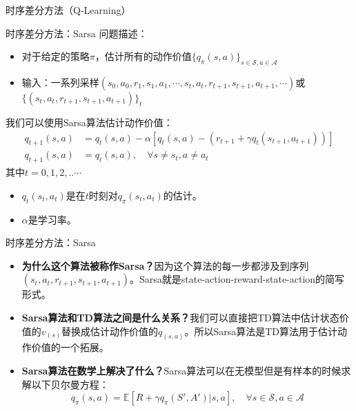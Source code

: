 \begin{section}{时序差分方法\alert{（Q-Learning）}}
\begin{frame}{时序差分方法：Sarsa}
    问题描述：
    \begin{itemize}
        \item 对于给定的策略$\pi$，估计所有的动作价值$\{q_\pi(s, a)\}_{s\in \mathcal{S}, a\in\mathcal{A}}$
        \item 输入：一系列采样\alert{$(s_0, a_0, r_1, s_1, a_1,\cdots,s_t, a_t, r_{t+1}, s_{t+1}, a_{t+1},\cdots)$}或$\{(s_t, a_t, r_{t+1}, s_{t+1}, a_{t+1})\}_t$
    \end{itemize}
    我们可以使用Sarsa算法估计动作价值：
    \[
        \begin{aligned}
            q_{t+1}(s,a)&=q_t(s,a)-\alpha[q_t(s,a)-(r_{t+1}+\gamma q_t(s_{t+1},a_{t+1}))] \\
            q_{t+1}(s,a)&=q_t(s,a), \quad \forall s\neq s_t, a\neq a_t
        \end{aligned}
    \]
    其中$t=0,1,2,..\cdots$
    \begin{itemize}
        \item $q_t(s_t,a_t)$是在$t$时刻对$q_\pi(s_t,a_t)$的估计。
        \item $\alpha$是学习率。
    \end{itemize}
\end{frame}

\begin{frame}{时序差分方法：Sarsa}
    \begin{itemize}
        \item \textbf{为什么这个算法被称作Sarsa？}因为这个算法的每一步都涉及到序列$(s_t, a_t, r_{t+1}, s_{t+1}, a_{t+1})$。Sarsa就是state-action-reward-state-action的简写形式。
        \item \textbf{Sarsa算法和TD算法之间是什么关系？}我们可以直接把TD算法中估计状态价值的$v_(s)$替换成估计动作价值的$q_(s,a)$。所以Sarsa算法是TD算法用于估计动作价值的一个拓展。
        \item \textbf{Sarsa算法在数学上解决了什么？}Sarsa算法可以在\alert{无模型}但是\alert{有样本}的时候求解以下贝尔曼方程：
        \[
            q_\pi(s,a)=\mathbb{E}[R+\gamma q_\pi(S',A')|s,a], \quad \forall s\in\mathcal{S}, a\in\mathcal{A}
        \]
    \end{itemize}   
\end{frame}


\end{section}
